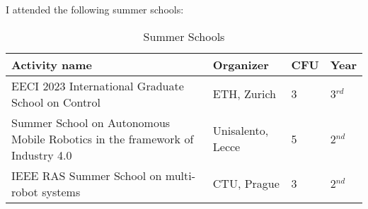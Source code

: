 I attended the following summer schools:
\begin{table}[H]
	\begin{center}
		\renewcommand{\arraystretch}{1.3} %
		\setlength{\tabcolsep}{8pt} %
		\begin{tabular}{P{10cm} P{3cm} P{0.8cm} P{0.8cm}}
			\toprule
			\textbf{Activity name} & \textbf{Organizer} & \textbf{CFU} & \textbf{Year} \\ 
			\midrule
			EECI 2023 International Graduate School on Control & ETH, Zurich & 3 & 3$^{rd}$ \\ 
			\midrule
			Summer School on Autonomous Mobile Robotics in the framework of Industry 4.0  & Unisalento, Lecce & 5 & 2$^{nd}$ \\ 
			\midrule
			IEEE RAS Summer School on multi-robot systems & CTU, Prague & 3 & 2$^{nd}$ \\	
			\bottomrule
		\end{tabular}
	\end{center}
	\caption{Summer Schools}
\end{table}
